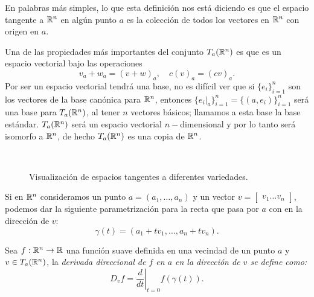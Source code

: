 En palabras más simples, lo que esta definición nos está diciendo es que el espacio tangente a $\mathbb{R}^n$ en algún punto $a$ es la colección de todos los vectores en $\mathbb{R}^n$ con origen en $a$.

Una de las propiedades más importantes del conjunto $T_a(\mathbb{R}^n)$ es que es un espacio vectorial bajo las operaciones
\[ v_a + w_a = (v + w)_{a}, \quad c(v)_{a} = (cv)_{a}. \]
Por ser un espacio vectorial tendrá una base, no es difícil ver que si $\{e_i\}_{i=1}^n$ son los vectores de la base canónica para $\mathbb{R}^n$, entonces $\{e_i|_{a}\}_{i=1}^n = \{(a,e_i)\}_{i=1}^n$ será una base para $T_a(\mathbb{R}^n)$, al tener $n$ vectores básicos; llamamos a esta base la base estándar. $T_a(\mathbb{R}^n)$ será un espacio vectorial $n-$dimensional y por lo tanto será isomorfo a $\mathbb{R}^n$, de hecho $T_a(\mathbb{R}^n)$ es una copia de $\mathbb{R}^n$.

\begin{center}
	\begin{figure}[h]
		\centering
		\begin{subfigure}{0.30\textwidth}
			\centering
			
		\end{subfigure}
		\hspace{60pt}
		\begin{subfigure}{0.30\textwidth}
			\centering
			
		\end{subfigure}
		\\[20pt]
		\begin{subfigure}{0.30\textwidth}
			\centering
			
		\end{subfigure}
		\hspace{60pt}
		\begin{subfigure}{0.30\textwidth}
			\centering
			
		\end{subfigure}
		\caption{Visualización de espacios tangentes a diferentes variedades.}
	\end{figure}
\end{center}

Si en $\mathbb{R}^n$ consideramos un punto $a = (a_1, \dots, a_n)$ y un vector $v = \begin{bmatrix} v_1 \dots v_n \end{bmatrix}$, podemos dar la siguiente parametrización para la recta que pasa por $a$ con en la dirección de $v$:
\[ \gamma(t) = (a_1 + tv_1, \dots, a_n + tv_n). \]

\begin{definition}\label{Definción: Derivada Direccional}
	Sea $f: \mathbb{R}^n \to \mathbb{R}$ una función suave definida en una vecindad de un punto $a$ y $v \in T_a(\mathbb{R}^n)$, la \it{derivada direccional} de $f$ en $a$ en la dirección de $v$ se define como:
	\[ D_v f = \left. \frac{d}{dt} \right|_{t=0} f(\gamma(t)). \]
\end{definition}

